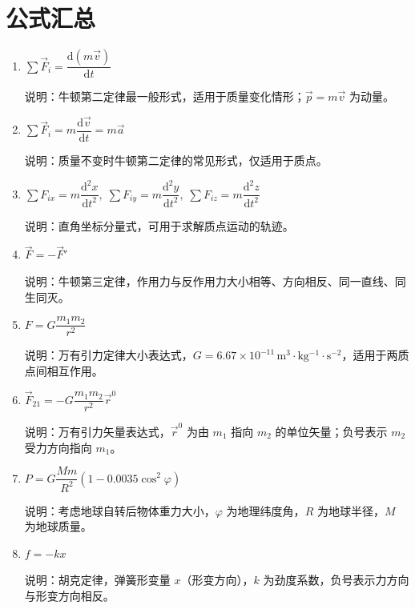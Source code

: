 \documentclass[12pt,a4paper]{ctexart}
\begin{document}
\section{公式汇总}

\begin{enumerate}[leftmargin=3em,label=\textbf{公式\arabic*}：,ref=公式\arabic*]

    \item $\displaystyle\sum \vec{F}_i = \dfrac{\mathrm{d}(m\vec{v})}{\mathrm{d}t}$

    说明：牛顿第二定律最一般形式，适用于质量变化情形；$\vec{p} = m\vec{v}$ 为动量。

    \item $\displaystyle\sum \vec{F}_i = m\dfrac{\mathrm{d}\vec{v}}{\mathrm{d}t} = m\vec{a}$

    说明：质量不变时牛顿第二定律的常见形式，仅适用于质点。

    \item $\sum F_{ix} = m\dfrac{\mathrm{d}^2 x}{\mathrm{d}t^2},\; \sum F_{iy} = m\dfrac{\mathrm{d}^2 y}{\mathrm{d}t^2},\; \sum F_{iz} = m\dfrac{\mathrm{d}^2 z}{\mathrm{d}t^2}$

    说明：直角坐标分量式，可用于求解质点运动的轨迹。

    \item $\vec{F} = -\vec{F}'$

    说明：牛顿第三定律，作用力与反作用力大小相等、方向相反、同一直线、同生同灭。

    \item $F = G\dfrac{m_1 m_2}{r^2}$

    说明：万有引力定律大小表达式，$G = 6.67\times10^{-11}\,\mathrm{m^3\cdot kg^{-1}\cdot s^{-2}}$，适用于两质点间相互作用。

    \item $\vec{F}_{21} = -G\dfrac{m_1 m_2}{r^2}\vec{r}^0$

    说明：万有引力矢量表达式，$\vec{r}^0$ 为由 $m_1$ 指向 $m_2$ 的单位矢量；负号表示 $m_2$ 受力方向指向 $m_1$。

    \item $P = G\dfrac{Mm}{R^2}(1 - 0.0035\cos^2\varphi)$

    说明：考虑地球自转后物体重力大小，$\varphi$ 为地理纬度角，$R$ 为地球半径，$M$ 为地球质量。

    \item $f = -kx$

    说明：胡克定律，弹簧形变量 $x$（形变方向），$k$ 为劲度系数，负号表示力方向与形变方向相反。


\end{enumerate}
\end{document}
